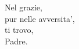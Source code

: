 
\begin{haiku}
    Nel grazie,\\
    pur nelle avversita',\\
    ti trovo,\\
    Padre.\\
\end{haiku}

